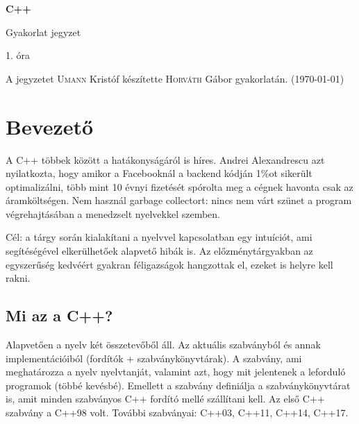 \documentclass[a4paper,11.5pt]{article}
\begin{document}
	\setlength\parindent{0pt}
	\def\s{\hspace{0.2mm}\vphantom{\beta}}
	\def\Z{\mathbb{Z}}
	\def\Q{\mathbb{Q}}
	\def\R{\mathbb{R}}
	\def\C{\mathbb{C}}
	\def\N{\mathbb{N}}
	\def\Ra{\overline{\mathbb{R}}}
	
	\def\sume{\displaystyle\sum_{n=1}^{+\infty}}
	\def\sumn{\displaystyle\sum_{n=0}^{+\infty}}
	
	\def\narrow{\underset{n\rightarrow+\infty}{\longrightarrow}}
	\def\limn{\displaystyle\lim_{n\to +\infty}}
	\def\limx{\displaystyle\lim_{x\to +\infty}}
	
	\theoremstyle{definition}
	\newtheorem{theorem}{Tétel}[subsection] 
	
	\theoremstyle{definition}
	\newtheorem{definition}[theorem]{Definíció} 
	\newtheorem{example}[theorem]{Példa} 
	\newtheorem{task}[theorem]{Feladat} 
	\newtheorem{note}[theorem]{Megjegyzés}
	\begin{center}
		{\LARGE\textbf{C++}}
		
		{\Large Gyakorlat jegyzet}
		
		1. óra
	\end{center}
	A jegyzetet \textsc{Umann} Kristóf készítette \textsc{Horváth} Gábor gyakorlatán. (\today)
	\section{Bevezető}
	A C++ többek között a hatákonyságáról is híres. Andrei Alexandrescu azt nyilatkozta, hogy amikor a Facebooknál a backend kódján 1\%ot sikerült optimalizálni, több mint 10 évnyi fizetését spórolta meg a cégnek havonta csak az áramköltségen. Nem használ garbage collectort: nincs nem várt szünet a program végrehajtásában a menedzselt nyelvekkel szemben.
	
	\medskip
	Cél: a tárgy során kialakítani a nyelvvel kapcsolatban egy intuíciót, ami segítéségével elkerülhetőek alapvető hibák is. Az előzménytárgyakban az egyszerűség kedvéért gyakran féligazságok hangzottak el, ezeket is helyre kell rakni.
	\subsection{Mi az a C++?}
  Alapvetően a nyelv két összetevőből áll. Az aktuális szabványból és annak implementációiból (fordítók + szabványkönyvtárak). A szabvány, ami meghatározza a nyelv nyelvtanját, valamint azt, hogy mit jelentenek a leforduló programok (többé kevésbé). Emellett a szabvány definiálja a szabványkönyvtárat is, amit minden szabványos C++ fordító mellé szállítani kell. Az első C++ szabvány a {C++98} volt. További szabványai: {C++03}, {C++11}, {C++14}, {C++17}.
	
\end{document}
